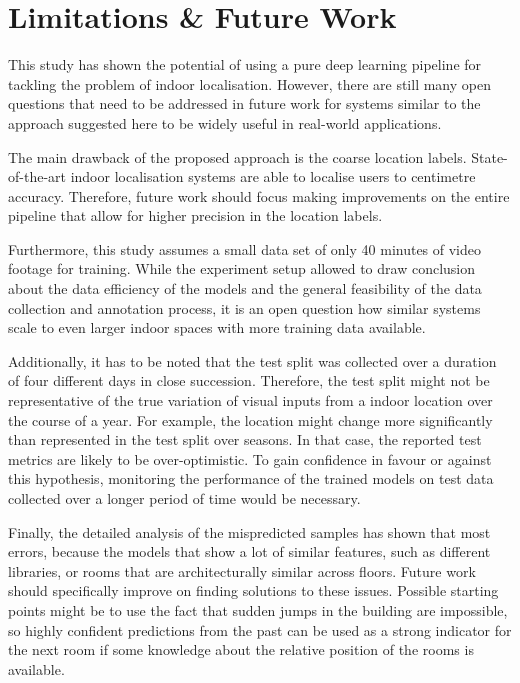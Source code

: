 \documentclass[a4paper]{article}
\begin{document}


  \section{Limitations \& Future Work} %
  \label{sec:discussion}

  This study has shown the potential of using a pure deep learning pipeline for
  tackling the problem of indoor localisation. However, there are still many
  open questions that need to be addressed in future work for systems similar to
  the approach suggested here to be widely useful in real-world applications.

  The main drawback of the proposed approach is the coarse location labels.
  State-of-the-art indoor localisation systems are able to localise users to
  centimetre accuracy. Therefore, future work should focus making improvements
  on the entire pipeline that allow for higher precision in the location labels.

  Furthermore, this study assumes a small data set of only 40 minutes of video
  footage for training. While the experiment setup allowed to draw conclusion
  about the data efficiency of the models and the general feasibility of the
  data collection and annotation process, it is an open question how similar
  systems scale to even larger indoor spaces with more training data available.

  Additionally, it has to be noted that the test split was collected over a
  duration of four different days in close succession. Therefore, the test split
  might not be representative of the true variation of visual inputs from a
  indoor location over the course of a year. For example, the location might
  change more significantly than represented in the test split over seasons.
  In that case, the reported test metrics are likely to be over-optimistic. To
  gain confidence in favour or against this hypothesis, monitoring the
  performance of the trained models on test data collected over a longer period
  of time would be necessary.

  Finally, the detailed analysis of the mispredicted samples has shown that
  most errors, because the models that show a lot of similar features, such as
  different libraries, or rooms that are architecturally similar across floors.
  Future work should specifically improve on finding solutions to these issues.
  Possible starting points might be to use the fact that sudden jumps in the
  building are impossible, so highly confident predictions from the past can be
  used as a strong indicator for the next room if some knowledge about the
  relative position of the rooms is available.
\end{document}
